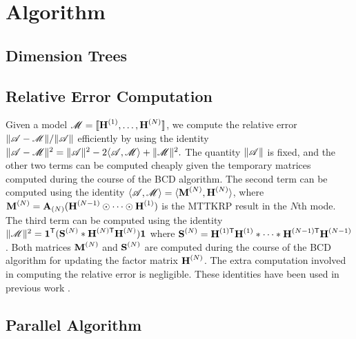 \section{Algorithm} 
\label{sec:algorithm}

\subsection{Dimension Trees}

\subsection{Relative Error Computation}

Given a model $\T{M}=\CP$, we compute the relative error $\|\TA - \T{M}\|/\|\TA\|$ efficiently by using the identity $\|\TA-\T{M}\|^2 = \|\TA\|^2 - 2\langle \TA, \T{M} \rangle + \|\T{M}\|^2.$
The quantity $\|\TA\|$ is fixed, and the other two terms can be computed cheaply given the temporary matrices computed during the course of the BCD algorithm.
The second term can be computed using the identity $\langle \TA, \T{M} \rangle = \langle \Mn{M}{N}, \Mn{H}{N} \rangle$, where $\Mn{M}{N} = \Mz{A}{N} (\Mn{H}{N-1} \Khat \cdots \Khat \Mn{H}{1})$ is the MTTKRP result in the $N$th mode.
The third term can be computed using the identity $\|\T{M}\|^2 = \V{1}^\Tra(\Mn{S}{N} \Hada \MnTra{H}{N} \Mn{H}{N})\V{1}$ where $\Mn{S}{N}=\MnTra{H}{1} \Mn{H}{1} \Hada \cdots \Hada \MnTra{H}{N-1} \Mn{H}{N-1}$.
Both matrices $\Mn{M}{N}$ and $\Mn{S}{N}$ are computed during the course of the BCD algorithm for updating the factor matrix $\Mn{H}{N}$.
The extra computation involved in computing the relative error is negligible.
These identities have been used in previous work \cite{KB09,TensorBox,SK16}.

\subsection{Parallel Algorithm}

